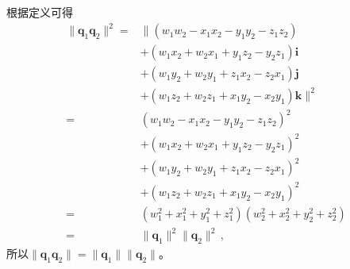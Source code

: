 \begin{prove}
    根据定义可得
    \begin{align}
        \|{\bm q}_1{\bm q}_2\|^2 = & \|(w_1w_2-x_1x_2-y_1y_2-z_1z_2)\nonumber                    \\
                                   & +(w_1x_2+w_2x_1+y_1z_2-y_2z_1)\mathbf{i}\nonumber           \\
                                   & +(w_1y_2+w_2y_1+z_1x_2-z_2x_1)\mathbf{j}\nonumber           \\
                                   & +(w_1z_2+w_2z_1+x_1y_2-x_2y_1)\mathbf{k}\|^2\nonumber       \\
        =                          & (w_1w_2-x_1x_2-y_1y_2-z_1z_2)^2\nonumber                    \\
                                   & +(w_1x_2+w_2x_1+y_1z_2-y_2z_1)^2\nonumber                   \\
                                   & +(w_1y_2+w_2y_1+z_1x_2-z_2x_1)^2\nonumber                   \\
                                   & +(w_1z_2+w_2z_1+x_1y_2-x_2y_1)^2\nonumber                   \\
        =                          & (w_1^2+x_1^2+y_1^2+z_1^2)(w_2^2+x_2^2+y_2^2+z_2^2)\nonumber \\
        =                          & \|{\bm q}_1\|^2\|{\bm q}_2\|^2\, ,
    \end{align}
    所以$\|{\bm q}_1{\bm q}_2\|=\|{\bm q}_1\|\|{\bm q}_2\|$。
\end{prove}


